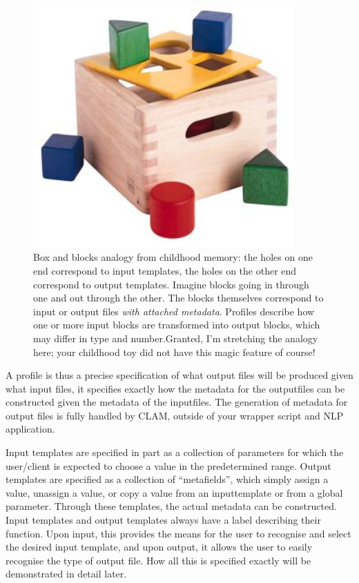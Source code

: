 \documentclass[a4paper,12pt]{report}
\begin{document}
\begin{figure}[h]
\begin{center}
\includegraphics[width=100.0mm]{blokkendoos.jpg}
\caption{Box and blocks analogy from childhood memory: the holes on one end correspond to input templates, the holes on the other end correspond to output templates. Imagine blocks going in through one and out through the other. The blocks themselves correspond to input or output files \emph{with attached metadata}. Profiles describe how one or more input blocks are transformed into output blocks, which may differ in type and number.Granted, I'm stretching the analogy here; your childhood toy did not have this magic feature of course!}
\label{fig:blokkendoos} 
\end{center}
\end{figure}

A profile is thus a precise specification of what output files will be produced given what input files,  it specifies exactly how the metadata for the outputfiles can be constructed given the metadata of the inputfiles. The generation of metadata for output files is fully handled by CLAM, outside of your wrapper script and NLP application.

Input templates are specified in part as a collection of parameters for which the user/client is expected to choose a value in the predetermined range. Output templates are specified as a collection of ``metafields'', which simply assign a value, unassign a value, or copy a value from an inputtemplate or from a global parameter. Through these templates, the actual metadata can be constructed. Input templates and output templates always have a label describing their function. Upon input, this provides the means for the user to recognise and select the desired input template, and upon output, it allows the user to easily recognise the type of output file. How all this is specified exactly will be demonstrated in detail later.
\end{document}
